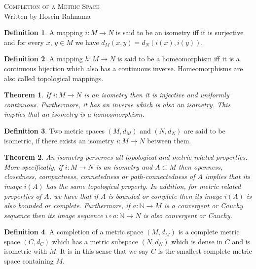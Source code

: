 \documentclass[10pt]{article}
\newtheorem{thm}{Theorem}
\theoremstyle{definition}
\newtheorem{defn}{Definition}
\theoremstyle{remark}
\begin{document}
\begin{center}
{\Large \scshape Completion of a Metric Space} \\
Written by Hosein Rahnama
\end{center}

\begin{defn}
A mapping $i:M\to N$ is said to be an isometry iff it is surjective and for every $x,\,y\in M$ we have $d_M(x,y)=d_N(i(x),i(y))$.
\end{defn}

\begin{defn}
A mapping $h:M\to N$ is said to be a homeomorphism iff it is a continuous bijection which also has a continuous inverse. Homeomorphisms are also called topological mappings.
\end{defn}

\begin{thm}
If $i:M\to N$ is an isometry then it is injective and uniformly continuous. Furthermore, it has an inverse which is also an isometry. This implies that an isometry is a homeomorphism.
\label{thm:iso}
\end{thm}

\begin{defn}
Two metric spaces $(M,d_M)$ and $(N,d_N)$ are said to be isometric, if there exists an isometry $i:M\to N$ between them.
\end{defn}

\begin{thm} 
An isometry perserves all topological and metric related properties. More specifically, if $i:M\to N$ is an isometry and $A\subset M$ then openness, closedness, compactness, connetedness or path-connectedness of $A$ implies that its image $i(A)$ has the same topological property. In addition, for metric related properties of $A$, we have that if $A$ is bounded or complete then its image $i(A)$ is also bounded or complete. Furthermore, if $a:\mathbb{N}\to M$ is a convergent or Cauchy sequence then its image sequence $i\circ a:\mathbb{N}\to N$ is also convergent or Cauchy.
\label{thm:iso:equi}
\end{thm}

\begin{defn}
A completion of a metric space $(M,d_M)$ is a complete metric space $(C,d_C)$ which has a metric subspace $(N,d_N)$ which is dense in $C$ and is isometric with $M$. It is in this sense that we say $C$ is the smallest complete metric space containing $M$.
\end{defn}
\end{document}
